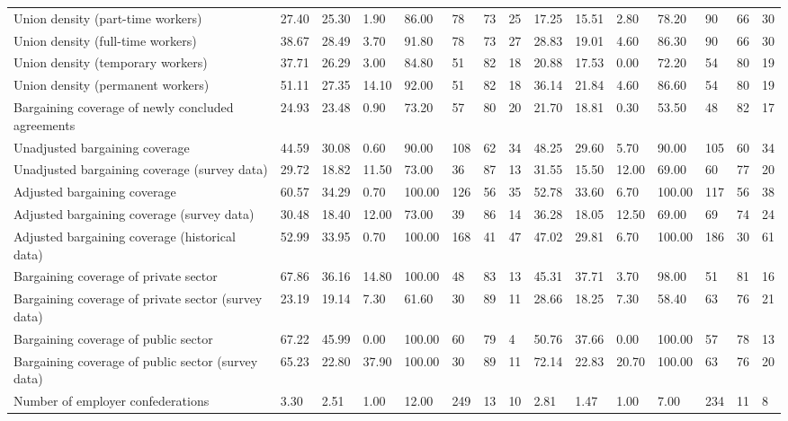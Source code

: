 \begin{longtable}{lllllllllllllll}
Union density (part-time workers) & 27.40 & 25.30 & 1.90 & 86.00 & 78 & 73 & 25 & 17.25 & 15.51 & 2.80 & 78.20 & 90 & 66 & 30\\
Union density (full-time workers) & 38.67 & 28.49 & 3.70 & 91.80 & 78 & 73 & 27 & 28.83 & 19.01 & 4.60 & 86.30 & 90 & 66 & 30\\
Union density (temporary workers) & 37.71 & 26.29 & 3.00 & 84.80 & 51 & 82 & 18 & 20.88 & 17.53 & 0.00 & 72.20 & 54 & 80 & 19\\
Union density (permanent workers) & 51.11 & 27.35 & 14.10 & 92.00 & 51 & 82 & 18 & 36.14 & 21.84 & 4.60 & 86.60 & 54 & 80 & 19\\
\addlinespace
Bargaining coverage of newly concluded agreements & 24.93 & 23.48 & 0.90 & 73.20 & 57 & 80 & 20 & 21.70 & 18.81 & 0.30 & 53.50 & 48 & 82 & 17\\
Unadjusted bargaining coverage & 44.59 & 30.08 & 0.60 & 90.00 & 108 & 62 & 34 & 48.25 & 29.60 & 5.70 & 90.00 & 105 & 60 & 34\\
Unadjusted bargaining coverage (survey data) & 29.72 & 18.82 & 11.50 & 73.00 & 36 & 87 & 13 & 31.55 & 15.50 & 12.00 & 69.00 & 60 & 77 & 20\\
Adjusted bargaining coverage & 60.57 & 34.29 & 0.70 & 100.00 & 126 & 56 & 35 & 52.78 & 33.60 & 6.70 & 100.00 & 117 & 56 & 38\\
Adjusted bargaining coverage (survey data) & 30.48 & 18.40 & 12.00 & 73.00 & 39 & 86 & 14 & 36.28 & 18.05 & 12.50 & 69.00 & 69 & 74 & 24\\
\addlinespace
Adjusted bargaining coverage (historical data) & 52.99 & 33.95 & 0.70 & 100.00 & 168 & 41 & 47 & 47.02 & 29.81 & 6.70 & 100.00 & 186 & 30 & 61\\
Bargaining coverage of private sector & 67.86 & 36.16 & 14.80 & 100.00 & 48 & 83 & 13 & 45.31 & 37.71 & 3.70 & 98.00 & 51 & 81 & 16\\
Bargaining coverage of private sector (survey data) & 23.19 & 19.14 & 7.30 & 61.60 & 30 & 89 & 11 & 28.66 & 18.25 & 7.30 & 58.40 & 63 & 76 & 21\\
Bargaining coverage of public sector & 67.22 & 45.99 & 0.00 & 100.00 & 60 & 79 & 4 & 50.76 & 37.66 & 0.00 & 100.00 & 57 & 78 & 13\\
Bargaining coverage of public sector (survey data) & 65.23 & 22.80 & 37.90 & 100.00 & 30 & 89 & 11 & 72.14 & 22.83 & 20.70 & 100.00 & 63 & 76 & 20\\
\addlinespace
Number of employer confederations & 3.30 & 2.51 & 1.00 & 12.00 & 249 & 13 & 10 & 2.81 & 1.47 & 1.00 & 7.00 & 234 & 11 & 8\\

\end{longtable}
